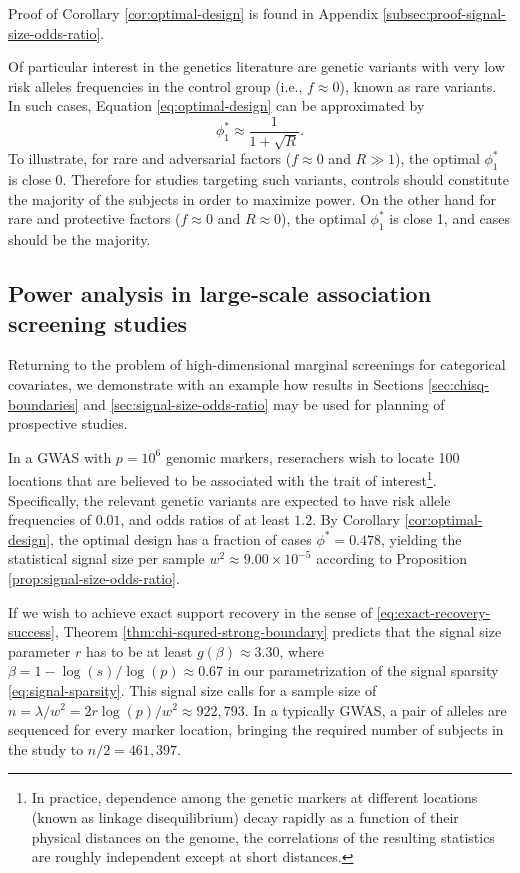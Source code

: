 Proof of Corollary \ref{cor:optimal-design} is found in Appendix \ref{subsec:proof-signal-size-odds-ratio}. 

Of particular interest in the genetics literature are genetic variants with very low risk alleles frequencies in the control group (i.e., $f\approx 0$), known as rare variants.
In such cases, Equation \eqref{eq:optimal-design} can be approximated by
\begin{equation} \label{eq:optimal-design-approx}
    \phi_1^* \approx \frac{1}{1 + \sqrt{R}}.
\end{equation}
To illustrate, for rare and adversarial factors ($f\approx0$ and $R\gg1$), the optimal $\phi_1^*$ is close 0.
Therefore for studies targeting such variants, controls should constitute the majority of the subjects in order to maximize power.
On the other hand for rare and protective factors ($f\approx0$ and $R\approx0$), the optimal $\phi_1^*$ is close 1, and cases should be the majority.

\subsection{Power analysis in large-scale association screening studies}

Returning to the problem of high-dimensional marginal screenings for categorical covariates, we demonstrate with an example how results in Sections \ref{sec:chisq-boundaries} and \ref{sec:signal-size-odds-ratio} may be used for planning of prospective studies.

\begin{example}
In a GWAS with $p = 10^6$ genomic markers, reserachers wish to locate 100 locations that are believed to be associated with the trait of interest\footnote{In practice, dependence among the genetic markers at different locations (known as linkage disequilibrium) decay rapidly as a function of their physical distances on the genome, the correlations of the resulting statistics are roughly independent except at short distances.}.
Specifically, the relevant genetic variants are expected to have risk allele frequencies of $0.01$, and odds ratios of at least $1.2$.
By Corollary \ref{cor:optimal-design}, the optimal design has a fraction of cases $\phi^* = 0.478$, yielding the statistical signal size per sample $w^2\approx9.00\times10^{-5}$ according to Proposition \ref{prop:signal-size-odds-ratio}.

If we wish to achieve exact support recovery in the sense of \eqref{eq:exact-recovery-success}, Theorem \ref{thm:chi-squred-strong-boundary} predicts that the signal size parameter $r$ has to be at least $g(\beta) \approx 3.30$, where $\beta = 1 - \log(s)/\log(p) \approx 0.67$ in our parametrization of the signal sparsity \eqref{eq:signal-sparsity}.
This signal size calls for a sample size of $n = \lambda / w^2 = 2r\log(p)/w^2 \approx 922,793$.
In a typically GWAS, a pair of alleles are sequenced for every marker location, bringing the required number of subjects in the study to $n / 2 = 461,397$.
\end{example}

